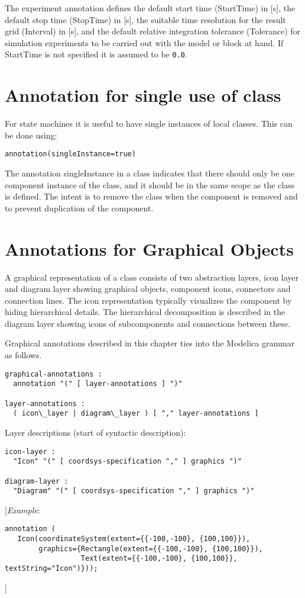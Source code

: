 The experiment annotation defines the default start time (StartTime) in
  {[}s{]}, the default stop time (StopTime) in {[}s{]}, the suitable time
  resolution for the result grid (Interval) in {[}s{]}, and the default
relative integration tolerance (Tolerance) for simulation experiments to
be carried out with the model or block at hand. If StartTime is not specified it is assumed to be \lstinline!0.0!.

\section{Annotation for single use of class}

For state machines it is useful to have single instances of local
classes. This can be done using:
\begin{lstlisting}[language=modelica]
annotation(singleInstance=true)
\end{lstlisting}

The annotation singleInstance in a class indicates that there should
only be one component instance of the class, and it should be in the
same scope as the class is defined. The intent is to remove the class
when the component is removed and to prevent duplication of the
component.

\section{Annotations for Graphical Objects}

A graphical representation of a class consists of two abstraction
layers, icon layer and diagram layer showing graphical objects,
component icons, connectors and connection lines. The icon
representation typically visualizes the component by hiding hierarchical
details. The hierarchical decomposition is described in the diagram
layer showing icons of subcomponents and connections between these.

Graphical annotations described in this chapter ties into the Modelica
grammar as follows.
\begin{lstlisting}[language=grammar]
graphical-annotations :
  annotation "(" [ layer-annotations ] ")"

layer-annotations :
  ( icon\_layer | diagram\_layer ) [ "," layer-annotations ]
\end{lstlisting}
Layer descriptions (start of syntactic description):
\begin{lstlisting}[language=grammar]
icon-layer :
  "Icon" "(" [ coordsys-specification "," ] graphics ")"

diagram-layer :
  "Diagram" "(" [ coordsys-specification "," ] graphics ")"
\end{lstlisting}
{[}\emph{Example}:
\begin{lstlisting}[language=modelica]
annotation (
   Icon(coordinateSystem(extent={{-100,-100}, {100,100}}),
        graphics={Rectangle(extent={{-100,-100}, {100,100}}),
                  Text(extent={{-100,-100}, {100,100}}, textString="Icon")}));
\end{lstlisting}
{]}


